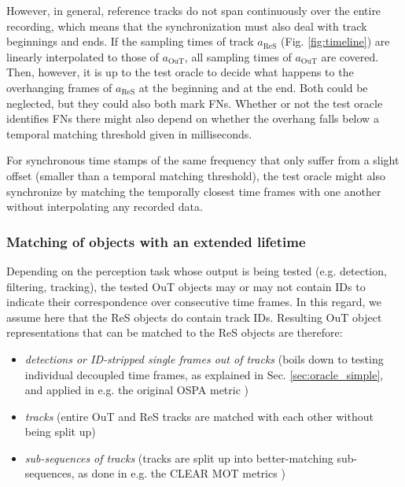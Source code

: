 \documentclass[conference]{IEEEtran}
\begin{document}
However, in general, reference tracks do not span continuously over the entire recording, which means that the synchronization must also deal with track beginnings and ends. %
If the sampling times of track $a_\text{ReS}$ (Fig. \ref{fig:timeline}) are linearly interpolated to those of $a_\text{OuT}$, all sampling times of $a_\text{OuT}$ are covered. 
Then, however, it is up to the test oracle to decide what happens to the overhanging frames of $a_\text{ReS}$ at the beginning and at the end. 
Both could be neglected, but they could also both mark FNs. 
Whether or not the test oracle identifies FNs there might also depend on whether the overhang falls below a temporal matching threshold given in milliseconds.

For synchronous time stamps of the same frequency that only suffer from a slight offset (smaller than a temporal matching threshold), the test oracle might also synchronize by matching the temporally closest time frames with one another without interpolating any recorded data.


\subsubsection{Matching of objects with an extended lifetime}
\label{sec:temp_matching}

Depending on the perception task whose output is being tested (e.g. detection, filtering, tracking), the tested OuT objects may or may not contain IDs to indicate their correspondence over consecutive time frames. 
In this regard, we assume here that the ReS objects do contain track IDs. 
Resulting OuT object representations that can be matched to the ReS objects are therefore:
\begin{itemize}
\item \textit{detections or ID-stripped single frames out of tracks} (boils down to testing individual decoupled time frames, as explained in Sec. \ref{sec:oracle_simple}, and applied in e.g. the original OSPA metric \cite{schuhmacher2008consistent}) %
\item \textit{tracks} (entire OuT and ReS tracks are matched with each other without being split up)
\item \textit{sub-sequences of tracks} (tracks are split up into better-matching sub-sequences, as done in e.g. the CLEAR MOT metrics \cite{bernardin2008evaluating})
\end{itemize}
\end{document}
